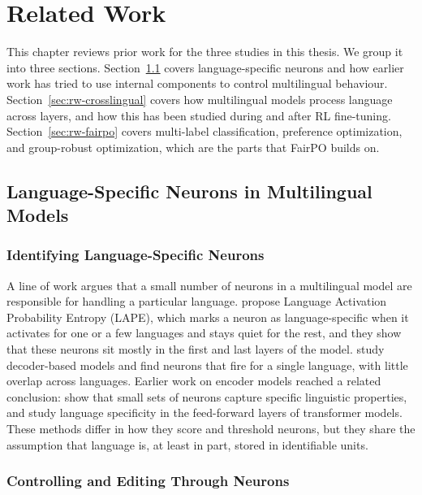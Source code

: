 \chapter{Related Work}
\label{ch:related-work}

This chapter reviews prior work for the three studies in this thesis. We group it
into three sections. Section~\ref{sec:rw-neurons} covers language-specific neurons
and how earlier work has tried to use internal components to control multilingual
behaviour. Section~\ref{sec:rw-crosslingual} covers how multilingual models
process language across layers, and how this has been studied during and after
RL fine-tuning. Section~\ref{sec:rw-fairpo} covers multi-label
classification, preference optimization, and group-robust optimization, which are
the parts that FairPO builds on.

\section{Language-Specific Neurons in Multilingual Models}
\label{sec:rw-neurons}

\subsection{Identifying Language-Specific Neurons}
\label{sec:rw-neurons-id}

A line of work argues that a small number of neurons in a multilingual model are
responsible for handling a particular language. \citet{tang2024language} propose
Language Activation Probability Entropy (LAPE), which marks a neuron as
language-specific when it activates for one or a few languages and stays quiet for
the rest, and they show that these neurons sit mostly in the first and last layers
of the model. \citet{kojima2024multilingual} study decoder-based models and find
neurons that fire for a single language, with little overlap across languages.
Earlier work on encoder models reached a related conclusion:
\citet{durrani2020analyzing} show that small sets of neurons capture specific
linguistic properties, and \citet{bhattacharya2023unveiling} study language
specificity in the feed-forward layers of transformer models. These methods differ
in how they score and threshold neurons, but they share the assumption that
language is, at least in part, stored in identifiable units.

\subsection{Controlling and Editing Through Neurons}
\label{sec:rw-neurons-control}

